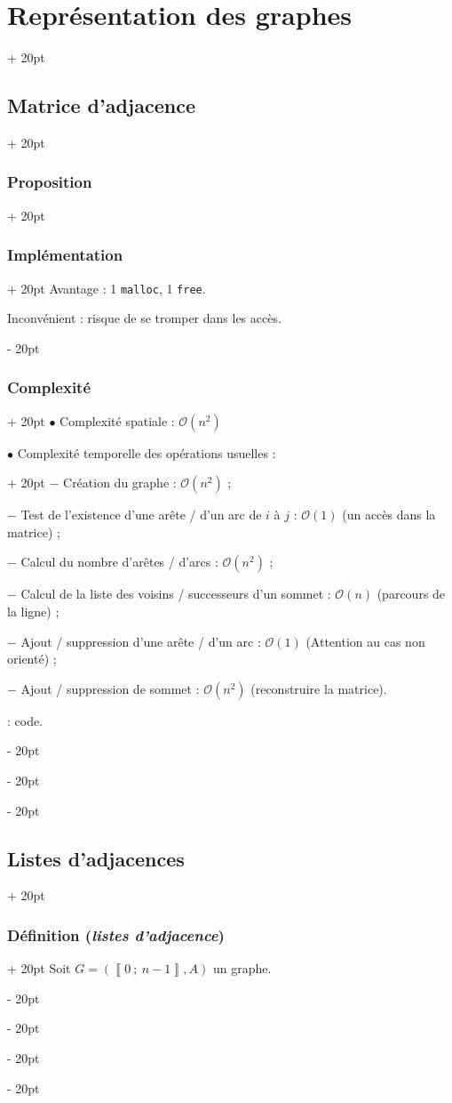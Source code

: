 \documentclass[a4paper, 12pt, twoside]{article}
\newcommand{\nset}[2]{\left\llbracket #1\ ;\ #2 \right\rrbracket}
\newcommand{\ind}[1][20pt]{\advance\leftskip + #1}
\newcommand{\deind}[1][20pt]{\advance\leftskip - #1}
\newenvironment{indt}[2][20pt]{#2 \par \ind[#1]}{\par \deind} %
\begin{document}
\begin{indt}{\section{Représentation des graphes}}
\begin{indt}{\subsection{Matrice d'adjacence}}
\begin{indt}{\subsubsection{Proposition}}
\begin{indt}{\subsubsection{Implémentation}}
                    Avantage : 1 \texttt{malloc}, 1 \texttt{free}.

                    Inconvénient : risque de se tromper dans les accès.
                \end{indt}

                \vspace{12pt}
                
                \begin{indt}{\subsubsection{Complexité}}
                    $\bullet$ Complexité spatiale : $\mathcal O(n^2)$

                    \begin{indt}{$\bullet$ Complexité temporelle des opérations usuelles :}
                        $-$ Création du graphe : $\mathcal O(n^2)$ ;

                        $-$ Test de l'existence  d'une arête / d'un arc de $i$ à $j$ : $\mathcal O(1)$ (un accès dans la matrice) ;

                        $-$ Calcul du nombre d'arêtes / d'arcs : $\mathcal O(n^2)$ ;

                        $-$ Calcul de la liste des voisins / successeurs d'un sommet : $\mathcal O(n)$ (parcours de la ligne) ;

                        $-$ Ajout / suppression d'une arête / d'un arc : $\mathcal O(1)$ (Attention au cas non orienté) ;

                        $-$ Ajout / suppression de sommet : $\mathcal O(n^2)$ (reconstruire la matrice).

                         : code.
                    \end{indt}
                \end{indt}
            \end{indt}

            \vspace{12pt}
            
            \begin{indt}{\subsection{Listes d'adjacences}}
                \begin{indt}{\subsubsection{Définition (\textit{listes d'adjacence})}}
                    Soit $G = (\nset 0 {n - 1}, A)$ un graphe.


\end{indt}
\end{indt}
\end{indt}
\end{indt}
\end{document}
